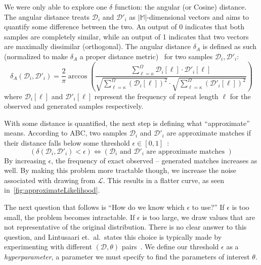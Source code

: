 We were only able to explore one $\delta$ function: the angular (or Cosine) distance.
The angular distance treats $\mathcal{D}_i$ and $\mathcal{D}'_i$ as $| \mathbb{M} |$-dimensional vectors
and aims to quantify some difference between the two.
An output of 0 indicates that both samples are completely similar, while an output of 1 indicates that two vectors
are maximally dissimilar (orthogonal).
The angular distance $\delta_A$ is defined as such (normalized to make $\delta_A$ a proper distance
metric)~\cite{chaComprehensiveSurveyDistance2007a} for two samples $\mathcal{D}_i, \mathcal{D}'_i$:
\begin{equation}
    \delta_A(\mathcal{D}_i, \mathcal{D}'_i) = \frac{2}{\pi} \arccos \left(
    \frac{\sum_{\ell=\kappa}^{\Omega} \mathcal{D}_i[\ell] \cdot \mathcal{D}'_i[\ell]}{
        \sqrt{\sum_{\ell=\kappa}^{\Omega} \left(\mathcal{D}_i[\ell]\right)^2} \cdot
        \sqrt{\sum_{\ell=\kappa}^{\Omega} \left(\mathcal{D}'_i[\ell]\right)^2}
    } \right)
\end{equation}
where $\mathcal{D}_i[\ell]$ and $\mathcal{D}'_i[\ell]$ represent the frequency of repeat length $\ell$ for the observed
and generated samples respectively.

With some distance is quantified, the next step is defining what ``approximate'' means.
According to ABC, two samples $\mathcal{D}_i$ and $\mathcal{D}'_i$ are approximate matches if their distance falls below
some threshold $\epsilon \in [0, 1]$~\cite{marjoramMarkovChainMonte2003}:
\begin{equation}
    \left(\delta(\mathcal{D}_i, \mathcal{D}'_i) < \epsilon \right) \Leftrightarrow
    \left(\mathcal{D}_i \text { and } \mathcal{D}'_i
    \text{ are approximate matches } \right)
\end{equation}
By increasing $\epsilon$, the frequency of exact observed -- generated matches increases as well.
By making this problem more tractable though, we increase the noise associated with drawing from $\mathcal{L}$.
This results in a flatter curve, as seen in~\autoref{fig:approximateLikelihood}.

The next question that follows is ``How do we know which $\epsilon$ to use?''
If $\epsilon$ is too small, the problem becomes intractable.
If $\epsilon$ is too large, we draw values that are not representative of the original distribution.
There is no clear answer to this question, and Lintusaari et.\ al.\ states this choice is typically made by
experimenting with different $(\mathcal{D}, \theta)$ pairs~\cite{lintusaariFundamentalsRecentDevelopments2017}.
We define our threshold $\epsilon$ as a \emph{hyperparameter}, a parameter we must specify to find the parameters of
interest $\theta$.

